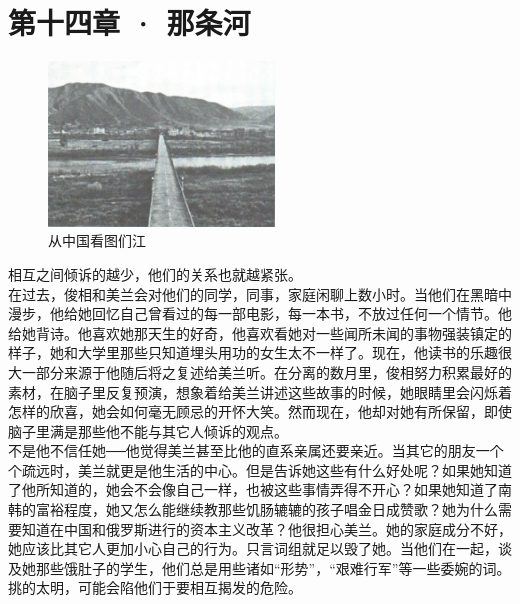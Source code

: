 \fancyhead[RO]{\thepage}
\fancyhead[LE]{\thepage}
\fancyfoot[LE,RO]{}
\fancyfoot[LO,CE]{}
\fancyfoot[CO,RE]{}
\chapter*{第十四章 · 那条河}
\begin{figure}[!htbp]
\centering
\includegraphics[width=6cm]{./Chapters/Images/14.jpg}
\caption*{从中国看图们江}
\end{figure}


相互之间倾诉的越少，他们的关系也就越紧张。\\

在过去，俊相和美兰会对他们的同学，同事，家庭闲聊上数小时。当他们在黑暗中漫步，他给她回忆自己曾看过的每一部电影，每一本书，不放过任何一个情节。他给她背诗。他喜欢她那天生的好奇，他喜欢看她对一些闻所未闻的事物强装镇定的样子，她和大学里那些只知道埋头用功的女生太不一样了。现在，他读书的乐趣很大一部分来源于他随后将之复述给美兰听。在分离的数月里，俊相努力积累最好的素材，在脑子里反复预演，想象着给美兰讲述这些故事的时候，她眼睛里会闪烁着怎样的欣喜，她会如何毫无顾忌的开怀大笑。然而现在，他却对她有所保留，即使脑子里满是那些他不能与其它人倾诉的观点。\\

不是他不信任她──他觉得美兰甚至比他的直系亲属还要亲近。当其它的朋友一个个疏远时，美兰就更是他生活的中心。但是告诉她这些有什么好处呢？如果她知道了他所知道的，她会不会像自己一样，也被这些事情弄得不开心？如果她知道了南韩的富裕程度，她又怎么能继续教那些饥肠辘辘的孩子唱金日成赞歌？她为什么需要知道在中国和俄罗斯进行的资本主义改革？他很担心美兰。她的家庭成分不好，她应该比其它人更加小心自己的行为。只言词组就足以毁了她。当他们在一起，谈及她那些饿肚子的学生，他们总是用些诸如“形势”，“艰难行军”等一些委婉的词。挑的太明，可能会陷他们于要相互揭发的危险。\\

